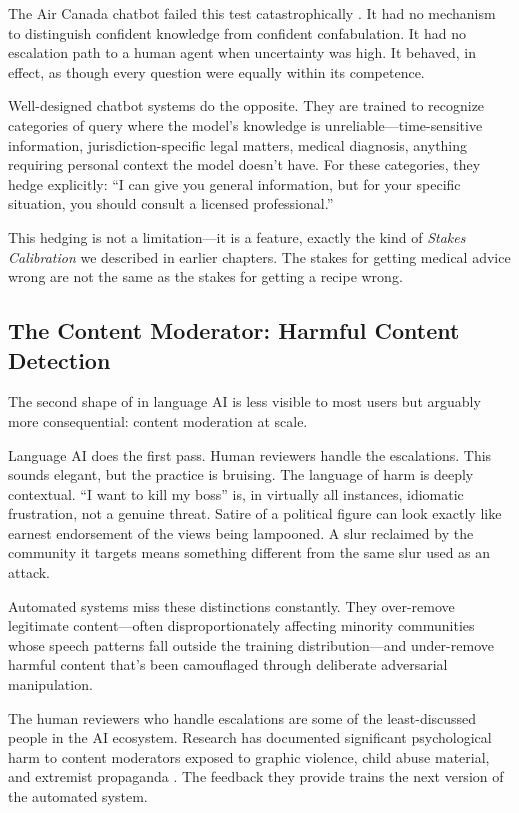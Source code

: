 The Air Canada chatbot failed this test catastrophically \autocite{moffatt2024}. It had no mechanism to distinguish confident knowledge from confident confabulation. It had no escalation path to a human agent when uncertainty was high. It behaved, in effect, as though every question were equally within its competence.

Well-designed chatbot systems do the opposite. They are trained to recognize categories of query where the model's knowledge is unreliable---time-sensitive information, jurisdiction-specific legal matters, medical diagnosis, anything requiring personal context the model doesn't have. For these categories, they hedge explicitly: ``I can give you general information, but for your specific situation, you should consult a licensed professional.''

This hedging is not a limitation---it is a feature, exactly the kind of \emph{Stakes Calibration} we described in earlier chapters. The stakes for getting medical advice wrong are not the same as the stakes for getting a recipe wrong.

\subsection{The Content Moderator: Harmful Content Detection}

The second shape of \hitl in language AI is less visible to most users but arguably more consequential: content moderation at scale.

Language AI does the first pass. Human reviewers handle the escalations. This sounds elegant, but the practice is bruising. The language of harm is deeply contextual. ``I want to kill my boss'' is, in virtually all instances, idiomatic frustration, not a genuine threat. Satire of a political figure can look exactly like earnest endorsement of the views being lampooned. A slur reclaimed by the community it targets means something different from the same slur used as an attack.

Automated systems miss these distinctions constantly. They over-remove legitimate content---often disproportionately affecting minority communities whose speech patterns fall outside the training distribution---and under-remove harmful content that's been camouflaged through deliberate adversarial manipulation.

The human reviewers who handle escalations are some of the least-discussed people in the AI ecosystem. Research has documented significant psychological harm to content moderators exposed to graphic violence, child abuse material, and extremist propaganda \autocite{steiger2021psychological}. The feedback they provide trains the next version of the automated system.


